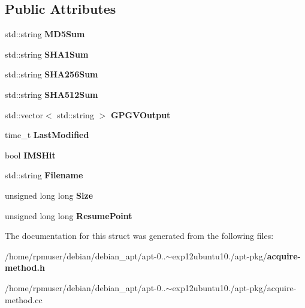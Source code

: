 \subsection*{\-Public \-Attributes}
\begin{DoxyCompactItemize}
\item 
std\-::string {\bfseries \-M\-D5\-Sum}\label{structpkgAcqMethod_1_1FetchResult_a1bb9c96cf88289ef3bbb1f137a8c07cb}

\item 
std\-::string {\bfseries \-S\-H\-A1\-Sum}\label{structpkgAcqMethod_1_1FetchResult_a14ce421b120ad8fc054920ffdc49f33c}

\item 
std\-::string {\bfseries \-S\-H\-A256\-Sum}\label{structpkgAcqMethod_1_1FetchResult_a1ec8fcab1b387a2c6c3a3dd3505700d3}

\item 
std\-::string {\bfseries \-S\-H\-A512\-Sum}\label{structpkgAcqMethod_1_1FetchResult_aa161ef0a86b9a188a7df83be8c10c531}

\item 
std\-::vector$<$ std\-::string $>$ {\bfseries \-G\-P\-G\-V\-Output}\label{structpkgAcqMethod_1_1FetchResult_a5da17feb96448592e8bafbcb9bf77a72}

\item 
time\-\_\-t {\bfseries \-Last\-Modified}\label{structpkgAcqMethod_1_1FetchResult_a7715b80087dbd228815c1cf9ff5cc166}

\item 
bool {\bfseries \-I\-M\-S\-Hit}\label{structpkgAcqMethod_1_1FetchResult_ae187d769df7a9f266e452c9c1aa04289}

\item 
std\-::string {\bfseries \-Filename}\label{structpkgAcqMethod_1_1FetchResult_a50fe9d306e50e9f356cc024154fd0827}

\item 
unsigned long long {\bfseries \-Size}\label{structpkgAcqMethod_1_1FetchResult_a254f9ca5c1e1232788dedebd142044aa}

\item 
unsigned long long {\bfseries \-Resume\-Point}\label{structpkgAcqMethod_1_1FetchResult_abd497ee7ec5dec08e88b4658730ecf63}

\end{DoxyCompactItemize}


\-The documentation for this struct was generated from the following files\-:\begin{DoxyCompactItemize}
\item 
/home/rpmuser/debian/debian\-\_\-apt/apt-\/0..$\sim$exp12ubuntu10./apt-\/pkg/{\bf acquire-\/method.\-h}\item 
/home/rpmuser/debian/debian\-\_\-apt/apt-\/0..$\sim$exp12ubuntu10./apt-\/pkg/acquire-\/method.\-cc\end{DoxyCompactItemize}
